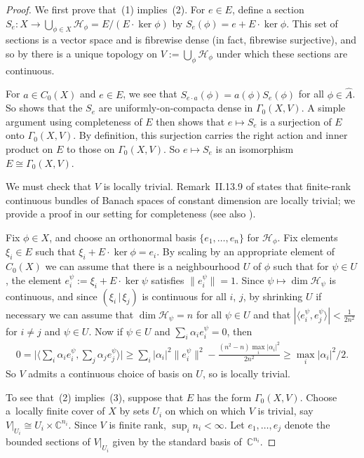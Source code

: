 \documentclass[10pt,a4paper]{amsart}
\numberwithin{equation}{section}
\newcommand{\C}{\mathbb{C}} %
\renewcommand{\H}{\mathcal{H}} %
\begin{document}
\begin{proof}
We f\/irst prove that~(1) implies~(2). For $e\in E$, def\/ine a section $S_e \colon X \to \bigcup_{\phi \in X} \H_\phi = E/(E \cdot \ker\phi)$ by $S_e(\phi) = e + E\cdot\ker\phi$. This set of sections is a vector space and is f\/ibrewise dense (in fact, f\/ibrewise surjective), and so by \cite[Theorem~II.13.18]{FellDoran} there is a unique topology on $V := \bigcup_\phi \H_\phi$ under which these sections are continuous.

For $a \in C_0(X)$ and $e \in E$, we see that $S_{e \cdot a}(\phi) = a(\phi)S_e(\phi)$ for all $\phi\in \hat{A}$. So \cite[Corollary~II.14.7]{FellDoran} shows that the $S_e$ are uniformly-on-compacta dense in $\Gamma_0(X, V)$. A simple argument using completeness
of $E$ then shows that $e \mapsto S_e$ is a surjection of $E$ onto $\Gamma_0(X, V)$. By def\/inition, this surjection carries the right action and inner product on $E$ to those on $\Gamma_0(X, V)$. So $e \mapsto S_e$ is an isomorphism $E \cong \Gamma_0(X, V)$.

We must check that $V$ is locally trivial. Remark~II.13.9 of \cite{FellDoran} states that f\/inite-rank continuous bundles of Banach spaces of constant dimension are locally trivial; we provide a proof in our setting for completeness (see also \cite[Remarque, p.~231]{DD}).

Fix $\phi \in X$, and choose an orthonormal basis $\{e_1, \dots, e_n\}$ for $\H_\phi$. Fix elements $\xi_i \in E$ such that $\xi_i + E \cdot \ker\phi = e_i$. By scaling by an appropriate element of $C_0(X)$ we can assume that there is a neighbourhood $U$ of $\phi$ such that for $\psi \in U$, the element $e^\psi_i := \xi_i + E \cdot \ker\psi$ satisf\/ies $\|e^\psi_i\| = 1$. Since $\psi \mapsto \dim\H_\psi$ is continuous, and since $(\xi_i \,|\, \xi_j)$ is continuous for all $i$, $j$, by shrinking $U$ if necessary we can assume that $\dim\H_\psi = n$ for all $\psi \in U$ and that $|\langle e^\psi_i, e^\psi_j\rangle| < \frac{1}{2n^2}$ for $i \not= j$ and $\psi \in U$. Now if $\psi \in U$ and $\sum_i \alpha_i e^\psi_i = 0$, then
\begin{gather*}
0 = \Big|\Big\langle \sum_i \alpha_i e^\psi_i, \sum_j \alpha_j e^\psi_j\Big\rangle\Big|
 \ge \sum_i |\alpha_i|^2 \|e^\psi_i\|^2 - \frac{(n^2-n) \max_i|\alpha_i|^2}{2n^2} \ge \max_i|\alpha_i|^2/2.
\end{gather*}
So $V$ admits a continuous choice of basis on $U$, so is locally trivial.

To see that~(2) implies~(3), suppose that $E$ has the form $\Gamma_0(X, V)$. Choose a~locally f\/inite cover of $X$ by sets $U_i$ on which on which $V$ is trivial, say $V|_{U_i} \cong U_i \times \C^{n_i}$. Since $V$ is f\/inite rank, $\sup_i n_i<\infty$. Let $e_1,\dots,e_j$ denote the bounded sections of $V|_{U_i}$ given by the standard basis of~$\C^{n_i}$.


\end{proof}
\end{document}
